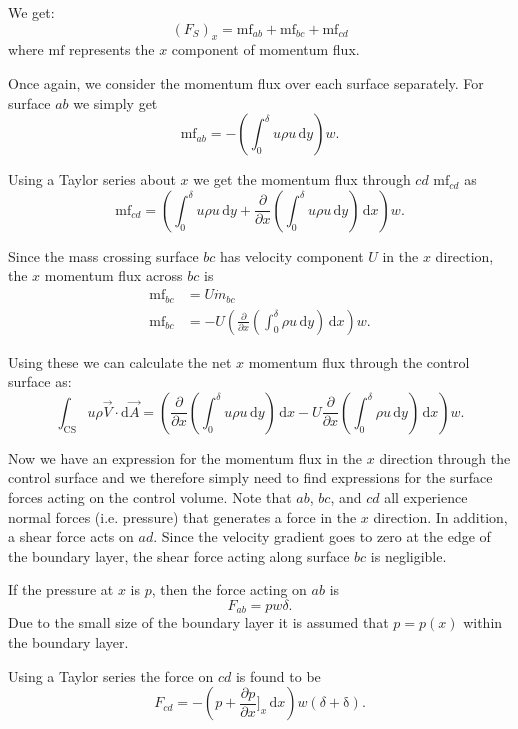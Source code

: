 We get:
\[ 
\left( F_S \right)_x = \mathrm{mf}_{ab} + \mathrm{mf}_{bc} + \mathrm{mf}_{cd}
\]
where $\mathrm{mf}$ represents the $x$ component of momentum flux.

Once again, we consider the momentum flux over each surface separately.
For surface $ab$ we simply get
\[ 
\mathrm{mf}_{ab} = - \left( \int_{0}^{\delta} u \rho u \, \mathrm{d}y  \right)w
.\]

Using a Taylor series about $x$ we get the momentum flux through $cd$ $\mathrm{mf}_{cd}$ as
\[ 
\mathrm{mf}_{cd} = \left( \int_{0}^{\delta} u \rho u \, \mathrm{d}y  + \frac{\partial }{\partial x} \left( \int_{0}^{\delta} u \rho u \, \mathrm{d}y  \right) \, \mathrm{d}x  \right)w
.\]

Since the mass crossing surface $bc$ has velocity component $U$ in the $x$ direction, the $x$ momentum flux across $bc$ is
\begin{align*}
  \mathrm{mf}_{bc} &= U \dot{m}_{bc} \\
  \mathrm{mf}_{bc} &= - U \left( \frac{\partial }{\partial x} \left( \int_{0}^{\delta} \rho u \, \mathrm{d}y  \right)\, \mathrm{d}x  \right)w
.\end{align*}

Using these we can calculate the net $x$ momentum flux through the control surface as:
\[ 
\int_{\mathrm{CS}} u \rho \Vec{V} \cdot \mathrm{d}\Vec{A} = \left( \frac{\partial }{\partial x} \left( \int_{0}^{\delta} u \rho u \, \mathrm{d}y  \right) \, \mathrm{d}x  - U \frac{\partial }{\partial x} \left( \int_{0}^{\delta} \rho u \, \mathrm{d}y  \right)\, \mathrm{d}x  \right)w
.\]

Now we have an expression for the momentum flux in the $x$ direction through the control surface and we therefore simply need to find expressions for the surface forces acting on the control volume.
Note that $ab$, $bc$, and $cd$ all experience normal forces (i.e. pressure) that generates a force in the $x$ direction. 
In addition, a shear force acts on $ad$.
Since the velocity gradient goes to zero at the edge of the boundary layer, the shear force acting along surface $bc$ is negligible.

If the pressure at $x$ is $p$, then the force acting on $ab$ is
\[ 
F_{ab} = p w \delta
.\]
Due to the small size of the boundary layer it is assumed that $p = p(x)$ within the boundary layer.

Using a Taylor series the force on $cd$ is found to be
\[ 
  F_{cd} = - \left( p + \frac{\partial p}{\partial x} \Bigg]_x \, \mathrm{d}x  \right) w \left( \delta + \mathrm{\delta}  \right)
.\]

